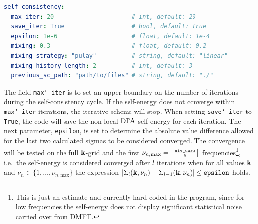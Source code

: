 \documentclass[../../main.tex]{subfiles}
\begin{document}
\begin{minipage}{\textwidth}%
\begin{lstlisting}[language=yaml]
self_consistency:
  max_iter: 20                      # int, default: 20
  save_iter: True                   # bool, default: True
  epsilon: 1e-6                     # float, default: 1e-4
  mixing: 0.3                       # float, default: 0.2
  mixing_strategy: "pulay"          # string, default: "linear"
  mixing_history_length: 2          # int, default: 3
  previous_sc_path: "path/to/files" # string, default: "./"
\end{lstlisting}
\end{minipage}
The field \texttt{max\char`_iter} is to set an upper boundary on the number of iterations during the self-consistency cycle. If the self-energy does not converge within \texttt{max\char`_iter} iterations, the iterative scheme will stop. When setting \texttt{save\char`_iter} to \texttt{True}, the code will save the non-local $\text{D}\Gamma\text{A}$ self-energy for each iteration. The next parameter, \texttt{epsilon}, is set to determine the absolute value difference allowed for the last two calculated sigmas to be considered converged. The convergence will be tested on the full $\textbf{k}$-grid and the first $\nu_{n,\mathrm{max}}=\left \lceil\frac{\text{\texttt{niv\char`_core}}}{5}\right\rceil$ frequencies\footnote{This is just an estimate and currently hard-coded in the program, since for low frequencies the self-energy does not display significant statistical noise carried over from DMFT.}, i.e.\ the self-energy is considered converged after $l$ iterations when for all values $\textbf{k}$ and $\nu_n\in\{1,\ldots,\nu_{n,\mathrm{max}}\}$ the expression $|\Sigma_{l}(\textbf{k}, \nu_n)-\Sigma_{l-1}(\textbf{k}, \nu_n)|\leq\text{\texttt{epsilon}}$ holds. 
\end{document}
